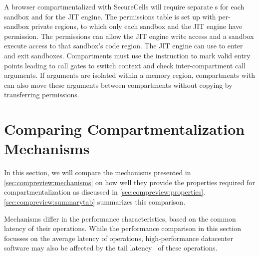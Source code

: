 A browser compartmentalized with SecureCells will require separate
\secdiv{}s for each sandbox and for the JIT engine.
The permissions table is set up with per-sandbox private regions, to which
only each sandbox and the JIT engine have permission.
The permissions can allow the JIT engine write access and a sandbox
execute access to that sandbox's code region.
The JIT engine can use  to enter and exit sandboxes.
Compartments must use the  instruction to mark valid entry points
leading to call gates to switch context and check inter-compartment call
arguments.
If arguments are isolated within a memory region, compartments with 
\seccells can also move these arguments between compartments without copying
by transferring permissions.

\section{Comparing Compartmentalization Mechanisms}
\label{sec:compreview:comparison}
In this section, we will compare the mechanisms presented in 
\autoref{sec:compreview:mechanisms} on how well they provide the properties
required for compartmentalization as discussed in 
\autoref{sec:compreview:properties}.
\autoref{sec:compreview:summarytab} summarizes this comparison.

Mechanisms differ in the performance characteristics, based on the 
common latency of their operations.
While the performance comparison in this section focusses on the 
average latency of operations, high-performance datacenter software 
may also be affected by the tail latency~\cite{LiSPG14} of these operations.


